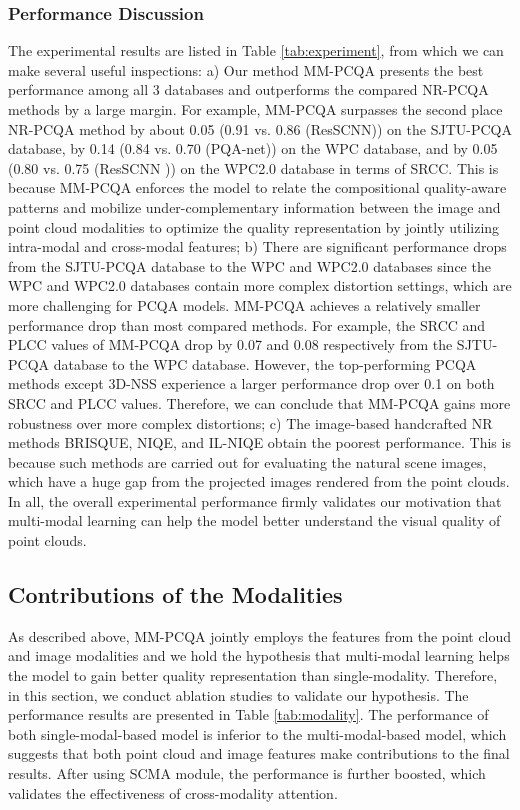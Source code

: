 \documentclass{article}
\begin{document}
\subsubsection{Performance Discussion}
The experimental results are listed in Table \ref{tab:experiment}, from which we can make several useful inspections: a) Our method MM-PCQA presents the best performance among all 3 databases and outperforms the compared NR-PCQA methods by a large margin. For example, MM-PCQA surpasses the second place NR-PCQA method by about 0.05 (0.91 vs. 0.86 (ResSCNN)) on the SJTU-PCQA database, by 0.14 (0.84 vs. 0.70 (PQA-net)) on the WPC database, and by 0.05 (0.80 vs. 0.75 (ResSCNN )) on the WPC2.0 database in terms of SRCC. This is because MM-PCQA enforces the model to relate the compositional quality-aware patterns and mobilize under-complementary information between the image and point cloud modalities to optimize the quality representation by jointly utilizing intra-modal and cross-modal features; b) There are significant performance drops from the SJTU-PCQA database to the WPC and WPC2.0 databases since the WPC and WPC2.0 databases contain more complex distortion settings, which are more challenging for PCQA models. MM-PCQA achieves a relatively smaller performance drop than most compared methods. For example, the SRCC and PLCC values of MM-PCQA drop by 0.07 and 0.08 respectively from the SJTU-PCQA database to the WPC database. However, the top-performing PCQA methods except 3D-NSS experience a larger performance drop over 0.1 on both SRCC and PLCC values. Therefore, we can conclude that MM-PCQA gains more robustness over more complex distortions; c) The image-based handcrafted NR methods BRISQUE, NIQE, and IL-NIQE obtain the poorest performance. This is because such methods are carried out for evaluating the natural scene images, which have a huge gap from the projected images rendered from the point clouds. 
In all, the overall experimental performance  firmly validates our motivation that multi-modal learning can help the model better understand the visual quality of point clouds. 










\subsection{Contributions of the Modalities}
As described above, MM-PCQA jointly employs the features from the point cloud and image modalities and we hold the hypothesis that multi-modal learning helps the model to gain better quality representation than single-modality. Therefore, in this section, we conduct ablation studies to validate our hypothesis. The performance results are presented in Table \ref{tab:modality}. The performance of both single-modal-based model is inferior to the multi-modal-based model, which suggests that both point cloud and image features make contributions to the final results. After using SCMA module, the performance is further boosted, which validates the effectiveness of cross-modality attention.  
\end{document}
